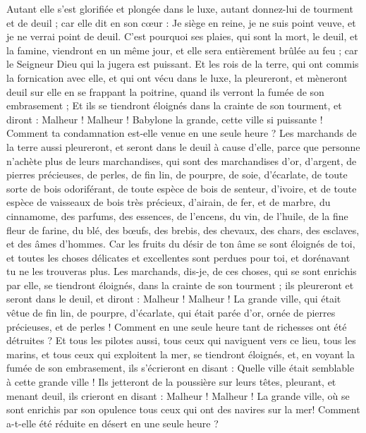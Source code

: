 \begin{multicols}{2}
Autant elle s'est glorifiée et plongée dans le luxe, autant donnez-lui de tourment et de deuil ; car elle dit en son cœur : Je siège en reine, je ne suis point veuve, et je ne verrai point de deuil.
C'est pourquoi ses plaies, qui sont la mort, le deuil, et la famine, viendront en un même jour, et elle sera entièrement brûlée au feu ; car le Seigneur Dieu qui la jugera est puissant.
Et les rois de la terre, qui ont commis la fornication avec elle, et qui ont vécu dans le luxe, la pleureront, et mèneront deuil sur elle en se frappant la poitrine, quand ils verront la fumée de son embrasement ;
Et ils se tiendront éloignés dans la crainte de son tourment, et diront : Malheur ! Malheur ! Babylone la grande, cette ville si puissante ! Comment ta condamnation est-elle venue en une seule heure ?
Les marchands de la terre aussi pleureront, et seront dans le deuil à cause d'elle, parce que personne n'achète plus de leurs marchandises,
qui sont des marchandises d'or, d'argent, de pierres précieuses, de perles, de fin lin, de pourpre, de soie, d'écarlate, de toute sorte de bois odoriférant, de toute espèce de bois de senteur, d'ivoire, et de toute espèce de vaisseaux de bois très précieux, d'airain, de fer, et de marbre,
du cinnamome, des parfums, des essences, de l'encens, du vin, de l'huile, de la fine fleur de farine, du blé, des bœufs, des brebis, des chevaux, des chars, des esclaves, et des âmes d'hommes.
Car les fruits du désir de ton âme se sont éloignés de toi, et toutes les choses délicates et excellentes sont perdues pour toi, et dorénavant tu ne les trouveras plus.
Les marchands, dis-je, de ces choses, qui se sont enrichis par elle, se tiendront éloignés, dans la crainte de son tourment ; ils pleureront et seront dans le deuil,
et diront : Malheur ! Malheur ! La grande ville, qui était vêtue de fin lin, de pourpre, d'écarlate, qui était parée d'or, ornée de pierres précieuses, et de perles ! Comment en une seule heure tant de richesses ont été détruites ?
Et tous les pilotes aussi, tous ceux qui naviguent vers ce lieu, tous les marins, et tous ceux qui exploitent la mer, se tiendront éloignés,
et, en voyant la fumée de son embrasement, ils s'écrieront en disant : Quelle ville était semblable à cette grande ville !
Ils jetteront de la poussière sur leurs têtes, pleurant, et menant deuil, ils crieront en disant : Malheur ! Malheur ! La grande ville, où se sont enrichis par son opulence tous ceux qui ont des navires sur la mer! Comment a-t-elle été réduite en désert en une seule heure ?

\end{multicols}
